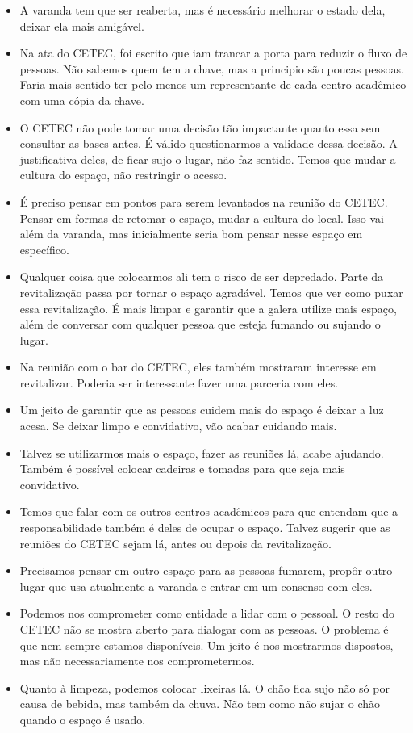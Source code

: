 \documentclass{ata-calico}
\begin{document}
\begin{itemize}
\item A varanda tem que ser reaberta, mas é necessário melhorar o estado dela, deixar ela mais amigável.
\item Na ata do CETEC, foi escrito que iam trancar a porta para reduzir o fluxo de pessoas. Não sabemos quem tem a chave, mas a principio são poucas pessoas. Faria mais sentido ter pelo menos um representante de cada centro acadêmico com uma cópia da chave.
\item O CETEC não pode tomar uma decisão tão impactante quanto essa sem consultar as bases antes. É válido questionarmos a validade dessa decisão. A justificativa deles, de ficar sujo o lugar, não faz sentido. Temos que mudar a cultura do espaço, não restringir o acesso.
\item É preciso pensar em pontos para serem levantados na reunião do CETEC. Pensar em formas de retomar o espaço, mudar a cultura do local. Isso vai além da varanda, mas inicialmente seria bom pensar nesse espaço em específico.
\item Qualquer coisa que colocarmos ali tem o risco de ser depredado. Parte da revitalização passa por tornar o espaço agradável. Temos que ver como puxar essa revitalização. É mais limpar e garantir que a galera utilize mais espaço, além de conversar com qualquer pessoa que esteja fumando ou sujando o lugar.
\item Na reunião com o bar do CETEC, eles também mostraram interesse em revitalizar. Poderia ser interessante fazer uma parceria com eles.
\item Um jeito de garantir que as pessoas cuidem mais do espaço é deixar a luz acesa. Se deixar limpo e convidativo, vão acabar cuidando mais.
\item Talvez se utilizarmos mais o espaço, fazer as reuniões lá, acabe ajudando. Também é possível colocar cadeiras e tomadas para que seja mais convidativo.
\item Temos que falar com os outros centros acadêmicos para que entendam que a responsabilidade também é deles de ocupar o espaço. Talvez sugerir que as reuniões do CETEC sejam lá, antes ou depois da revitalização.
\item Precisamos pensar em outro espaço para as pessoas fumarem, propôr outro lugar que usa atualmente a varanda e entrar em um consenso com eles.
\item Podemos nos comprometer como entidade a lidar com o pessoal. O resto do CETEC não se mostra aberto para dialogar com as pessoas. O problema é que nem sempre estamos disponíveis. Um jeito é nos mostrarmos dispostos, mas não necessariamente nos comprometermos.
\item Quanto à limpeza, podemos colocar lixeiras lá. O chão fica sujo não só por causa de bebida, mas também da chuva. Não tem como não sujar o chão quando o espaço é usado.
\end{itemize}
\end{document}
